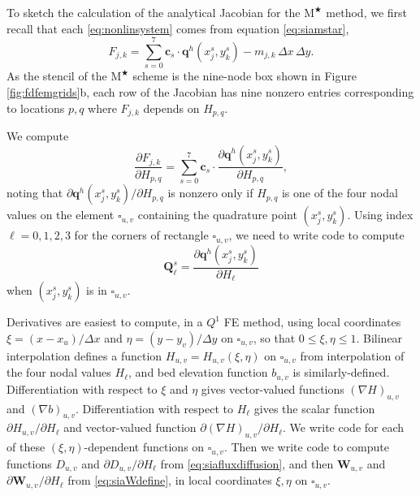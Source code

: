 \documentclass[twocolumn,a4paper]{igs}
\newcommand\bc{\mathbf{c}}
\newcommand\bq{\mathbf{q}}
\newcommand\bQ{\mathbf{Q}}
\newcommand\bW{\mathbf{W}}
\newcommand{\grad}{\nabla}
\newcommand{\Mstar}{$\text{M}^{\bigstar}$\xspace}
\begin{document}
To sketch the calculation of the analytical Jacobian for the \Mstar method, we first recall that each \eqref{eq:nonlinsystem} comes from equation \eqref{eq:siamstar},
\begin{equation}
  F_{j,k} = \sum_{s=0}^7 \bc_s\cdot \bq^h(x_j^s,y_k^s) - m_{j,k}\,\Delta x\,\Delta y.  \label{eq:res}
\end{equation}
As the stencil of the \Mstar scheme is the nine-node box shown in Figure \ref{fig:fdfemgrids}b, each row of the Jacobian has nine nonzero entries corresponding to locations $p,q$ where $F_{j,k}$ depends on $H_{p,q}$.

We compute
\begin{equation}
\frac{\partial F_{j,k}}{\partial H_{p,q}} = \sum_{s=0}^7 \bc_s\cdot \frac{\partial \bq^h(x_j^s,y_k^s)}{\partial H_{p,q}}, \label{eq:jacQsum}
\end{equation}
noting that $\partial \bq^h(x_j^s,y_k^s)/\partial H_{p,q}$ is nonzero only if $H_{p,q}$ is one of the four nodal values on the element $\square_{u,v}$ containing the quadrature point $(x_j^s,y_k^s)$.  Using index $\ell=0,1,2,3$ for the corners of rectangle $\square_{u,v}$, we need to write code to compute
\begin{equation}
\bQ_\ell^s = \frac{\partial \bq^h(x_j^s,y_k^s)}{\partial H_\ell} \label{eq:jacthegoal}
\end{equation}
when $(x_j^s,y_k^s)$ is in $\square_{u,v}$.

\newcommand{\uppoint}{(\xi_{\text{up}}^s,\eta_{\text{up}}^s)}
Derivatives are easiest to compute, in a $Q^1$ FE method, using local coordinates $\xi=(x-x_u)/\Delta x$ and $\eta=(y-y_v)/\Delta y$ on $\square_{u,v}$, so that $0\le \xi,\eta \le 1$.  Bilinear interpolation defines a function $H_{u,v}=H_{u,v}(\xi,\eta)$ on $\square_{u,v}$ from interpolation of the four nodal values $H_\ell$, and bed elevation function $b_{u,v}$ is similarly-defined.  Differentiation with respect to $\xi$ and $\eta$ gives vector-valued functions $(\grad H)_{u,v}$ and $(\grad b)_{u,v}$.  Differentiation with respect to $H_\ell$ gives the scalar function $\partial H_{u,v}/\partial H_\ell$ and vector-valued function $\partial (\grad H)_{u,v}/\partial H_\ell$.  We write code for each of these $(\xi,\eta)$-dependent functions on $\square_{u,v}$.  Then we write code to compute functions $D_{u,v}$ and $\partial D_{u,v}/\partial H_\ell$ from \eqref{eq:siafluxdiffusion}, and then $\bW_{u,v}$ and $\partial \bW_{u,v}/\partial H_\ell$ from \eqref{eq:siaWdefine}, in local coordinates $\xi,\eta$ on $\square_{u,v}$.
\end{document}
